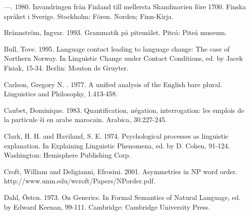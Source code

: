 \begin{styleBodytextC}
—. 1980. Invandringen från Finland till mellersta Skandinavien före 1700. Finska språket i Sverige. Stockholm: Fören. Norden; Finn-Kirja.

\end{styleBodytextC}

\begin{styleBodytextC}
Brännström, Ingvar. 1993. Grammatik på pitemålet. Piteå: Piteå museum.

\end{styleBodytextC}

\begin{styleBodytextC}
Bull, Tove. 1995. Language contact leading to language change: The case of Northern Norway. In Linguistic Change under Contact Conditions, ed. by Jacek Fisiak, 15-34. Berlin: Mouton de Gruyter.

\end{styleBodytextC}

\begin{styleBodytextC}
Carlson, Gregory N. . 1977. A unified analysis of the English bare plural. Linguistics and Philosophy, 1.413-458.

\end{styleBodytextC}

\begin{styleBodytextC}
Caubet, Dominique. 1983. Quantification, négation, interrogation: les emplois de la particule {\textquotedbl}ši{\textquotedbl} en arabe marocain. Arabica, 30.227-245.

\end{styleBodytextC}

\begin{styleBodytextC}
Clark, H. H. and Haviland, S. E. 1974. Psychological processes as linguistic explanation. In Explaining Linguistic Phenomena, ed. by D. Cohen, 91-124. Washington: Hemisphere Publishing Corp.

\end{styleBodytextC}

\begin{styleBodytextC}
Croft, William and Deligianni, Efrosini. 2001. Asymmetries in NP word order. http://www.unm.edu/{\Tilde}wcroft/Papers/NPorder.pdf. 

\end{styleBodytextC}

\begin{styleBodytextC}
Dahl, Östen. 1973. On Generics. In Formal Semantics of Natural Language, ed. by Edward Keenan, 99-111. Cambridge: Cambridge University Press.

\end{styleBodytextC}

